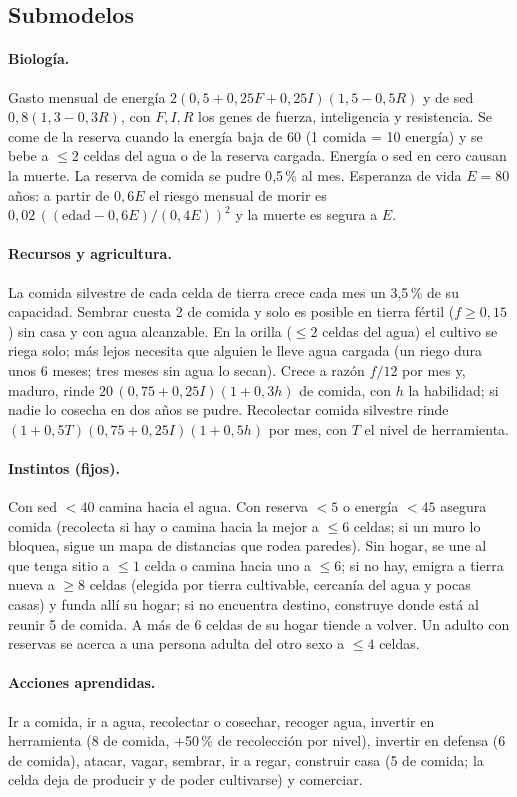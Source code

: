 \documentclass[11pt,a4paper]{article}
\begin{document}
\subsection{Submodelos}
\paragraph{Biología.} Gasto mensual de energía $2(0{,}5+0{,}25F+0{,}25I)(1{,}5-0{,}5R)$ y de sed $0{,}8(1{,}3-0{,}3R)$, con $F,I,R$ los genes de fuerza, inteligencia y resistencia. Se come de la reserva cuando la energía baja de 60 (1 comida = 10 energía) y se bebe a $\le 2$ celdas del agua o de la reserva cargada. Energía o sed en cero causan la muerte. La reserva de comida se pudre 0{,}5\,\% al mes. Esperanza de vida $E=80$ años: a partir de $0{,}6E$ el riesgo mensual de morir es $0{,}02\,((\text{edad}-0{,}6E)/(0{,}4E))^2$ y la muerte es segura a $E$.
\paragraph{Recursos y agricultura.} La comida silvestre de cada celda de tierra crece cada mes un 3{,}5\,\% de su capacidad. Sembrar cuesta 2 de comida y solo es posible en tierra fértil ($f\ge0{,}15$) sin casa y con agua alcanzable. En la orilla ($\le 2$ celdas del agua) el cultivo se riega solo; más lejos necesita que alguien le lleve agua cargada (un riego dura unos 6 meses; tres meses sin agua lo secan). Crece a razón $f/12$ por mes y, maduro, rinde $20\,(0{,}75+0{,}25I)(1+0{,}3h)$ de comida, con $h$ la habilidad; si nadie lo cosecha en dos años se pudre. Recolectar comida silvestre rinde $(1+0{,}5T)(0{,}75+0{,}25I)(1+0{,}5h)$ por mes, con $T$ el nivel de herramienta.
\paragraph{Instintos (fijos).} Con sed $<40$ camina hacia el agua. Con reserva $<5$ o energía $<45$ asegura comida (recolecta si hay o camina hacia la mejor a $\le 6$ celdas; si un muro lo bloquea, sigue un mapa de distancias que rodea paredes). Sin hogar, se une al que tenga sitio a $\le 1$ celda o camina hacia uno a $\le 6$; si no hay, emigra a tierra nueva a $\ge 8$ celdas (elegida por tierra cultivable, cercanía del agua y pocas casas) y funda allí su hogar; si no encuentra destino, construye donde está al reunir 5 de comida. A más de 6 celdas de su hogar tiende a volver. Un adulto con reservas se acerca a una persona adulta del otro sexo a $\le 4$ celdas.
\paragraph{Acciones aprendidas.} Ir a comida, ir a agua, recolectar o cosechar, recoger agua, invertir en herramienta (8 de comida, +50\,\% de recolección por nivel), invertir en defensa (6 de comida), atacar, vagar, sembrar, ir a regar, construir casa (5 de comida; la celda deja de producir y de poder cultivarse) y comerciar.
\end{document}
